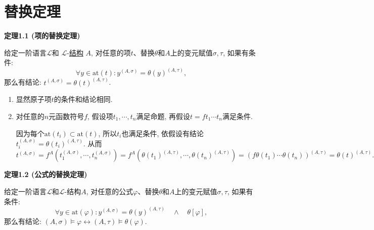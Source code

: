 \documentclass[UTF8]{ctexart}
\begin{document}
\setlength{\abovedisplayskip}{1pt}
\setlength{\belowdisplayskip}{1pt}

\section{替换定理}

\hypertarget{sec:定理1.1}{}
\noindent\textbf{定理1.1 (项的替换定理)}

给定一阶语言$\mathcal{L}$和
$\mathcal{L}$-\href{../01 一阶语言的结构/01 一阶语言的结构#nameddest=sec:定义1.1}
{结构} $A$, 对任意的项$t$、替换$\theta$和$A$上的变元赋值$\sigma,\tau$, 如果有条件:
\[
    \forall y\in\mathrm{at}(t):y^{(A,\sigma)}=\theta(y)^{(A,\tau)},
\]
那么有结论: $t^{(A,\sigma)}=\theta(t)^{(A,\tau)}$.


\begin{enumerate}
    \item 显然原子项$t$的条件和结论相同.
    \item 对任意的$n$元函数符号$f$, 假设项$t_1,\cdots,t_n$满足命题,
    再假设$t=ft_1\cdots t_n$满足条件.
    
    \hspace{2.17em}
    因为每个$\mathrm{at}(t_i)\subset\mathrm{at}(t)$,
    所以$t_i$也满足条件, 依假设有结论$t_i^{(A,\sigma)}=\theta(t_i)^{(A,\tau)}$. 从而
    \begin{equation*}
        t^{(A,\sigma)}=f^A(t_1^{(A,\sigma)},\cdots,t_n^{(A,\sigma)})=
        f^A(\theta(t_1)^{(A,\tau)},\cdots,\theta(t_n)^{(A,\tau)})
        =(f\theta(t_1)\cdots\theta(t_n))^{(A,\tau)}=\theta(t)^{(A,\tau)}.
    \tag*{\qedsymbol}\end{equation*}
\end{enumerate}

\vspace{10pt}

\hypertarget{sec:定理1.2}{}
\noindent\textbf{定理1.2 (公式的替换定理)}

给定一阶语言$\mathcal{L}$和$\mathcal{L}$-结构$A$,
对任意的公式$\varphi$、替换$\theta$和$A$上的变元赋值$\sigma,\tau$, 如果有条件:
\[
    \forall y\in\mathrm{at}(\varphi):
    y^{(A,\sigma)}=\theta(y)^{(A,\tau)}\quad\land\quad\theta[\varphi],
\]
那么有结论: $(A,\sigma)\models\varphi\leftrightarrow
(A,\tau)\models\theta(\varphi)$.

\end{document}
